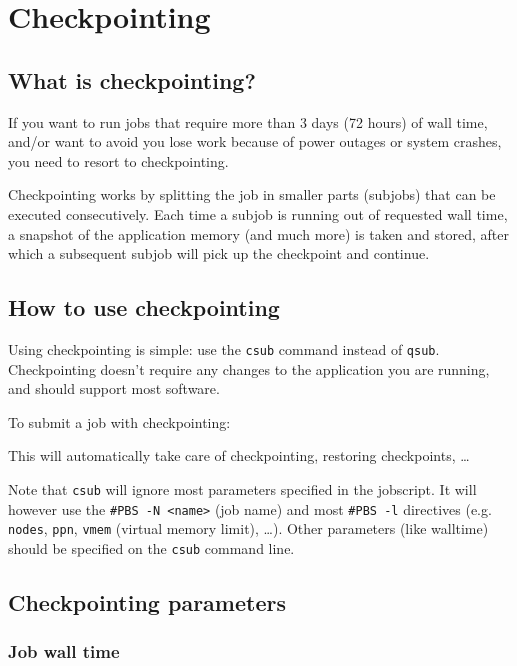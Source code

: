 \chapter{Checkpointing}
\label{ch:checkpointing}

\section{What is checkpointing?}

If you want to run jobs that require more than 3 days (72 hours) of wall time,
and/or want to avoid you lose work because of power outages or system crashes,
you need to resort to checkpointing.

Checkpointing works by splitting the job in smaller parts (subjobs) that can be executed
consecutively. Each time a subjob is running out of requested wall time,
a snapshot of the application memory (and much more) is taken and stored,
after which a subsequent subjob will pick up the checkpoint and continue.

\section{How to use checkpointing}

Using checkpointing is simple: use the \lstinline|csub| command instead of \lstinline|qsub|.
Checkpointing doesn't require any changes to the application you are running,
and should support most software.

To submit a job with checkpointing:

\begin{prompt}
\end{prompt}

This will automatically take care of checkpointing, restoring checkpoints, \ldots

Note that \lstinline|csub| will ignore most parameters specified in the jobscript.
It will however use the \lstinline|#PBS -N <name>| (job name) and most \lstinline|#PBS -l|
directives (e.g. \lstinline|nodes|, \lstinline|ppn|, \lstinline|vmem| (virtual memory limit),
\ldots). Other parameters (like walltime) should be specified on the \lstinline|csub|
command line.

\section{Checkpointing parameters}

\subsection{Job wall time}

